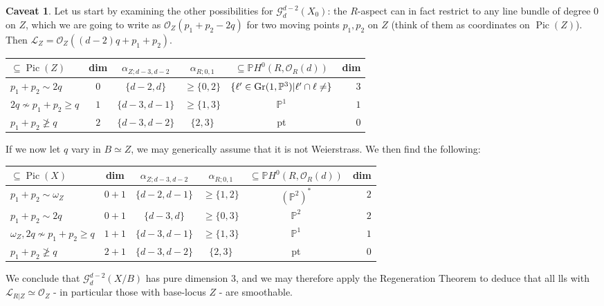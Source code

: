 \documentclass[11pt]{amsart}
\newcommand{\PP}{\mathbb P}
\newcommand{\OO}{\mathcal O}
\newcommand{\Pic}{\operatorname{Pic}}
\theoremstyle{plain}
\theoremstyle{definition}
\newtheorem{caveat}{Caveat}
\begin{document}
\begin{caveat}
 Let us start by examining the other possibilities for $\mathcal G^{d-2}_d(X_0)$: the $R$-aspect can in fact restrict to any line bundle of degree $0$ on $Z$, which we are going to write as $\OO_Z(p_1+p_2-2q)$ for two moving points $p_1,p_2$ on $Z$ (think of them as coordinates on $\Pic(Z)$). Then $\mathcal L_Z=\OO_Z((d-2)q+p_1+p_2)$.
 
 \hspace{-.7cm} \begin{tabular}{lc|c|c|cr}
  $\subseteq\Pic(Z)$ & dim & $\alpha_{Z;d-3,d-2}$ & $\alpha_{R;0,1}$ & $\subseteq \PP H^0(R,\OO_R(d))$ & dim \\ \hline
  $p_1+p_2\sim 2q$ & $0$ & $\{d-2,d\}$ & $\geq\{0,2\}$ & $\{\ell^\prime\in\operatorname{Gr}(1,\PP^3)|\ell^\prime\cap\ell\neq\empty
  \}$ & $3$\\
  $2q\nsim p_1+p_2\geq q$ & $1$ & $\{d-3,d-1\}$ & $\geq\{1,3\}$ & $\PP^1$ & $1$\\
  $p_1+p_2\ngeq q$ & $2$ & $\{d-3,d-2\}$ & $\{2,3\}$ & pt & $0$\\
 \end{tabular}

 If we now let $q$ vary in $B\simeq Z$, we may generically assume that it is not Weierstrass. We then find the following:
 
 \hspace{-.7cm} \begin{tabular}{lc|c|c|cr}
  $\subseteq\Pic(X)$ & dim & $\alpha_{Z;d-3,d-2}$ & $\alpha_{R;0,1}$ & $\subseteq\PP H^0(R,\OO_R(d))$ & dim \\ \hline
  $p_1+p_2\sim \omega_Z$ & $0+1$ & $\{d-2,d-1\}$ & $\geq\{1,2\}$ & $(\PP^{2})^*$ & $2$\\
  $p_1+p_2\sim 2q$ & $0+1$ & $\{d-3,d\}$ & $\geq\{0,3\}$ & $\PP^2$ & $2$\\
  $\omega_Z,2q\nsim p_1+p_2\geq q$ & $1+1$ & $\{d-3,d-1\}$ & $\geq\{1,3\}$ & $\PP^1$ & $1$\\
  $p_1+p_2\ngeq q$ & $2+1$ & $\{d-3,d-2\}$ & $\{2,3\}$ & pt & $0$\\
 \end{tabular}
 
 We conclude that $\mathcal G^{d-2}_d(X/B)$ has pure dimension $3$, and we may therefore apply the Regeneration Theorem to deduce that all lls with $\mathcal L_{R|Z}\simeq\OO_Z$ - in particular those with base-locus $Z$ - are smoothable.
\end{caveat}
\end{document}
